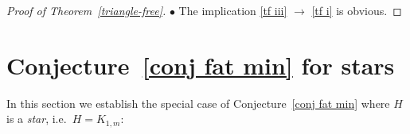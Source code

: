 \documentclass[a4paper]{article}
\newcommand{\Debug}{0}
\newcommand{\comment}[1]{}
\newcommand{\defi}[1]{{\color{darkgray}\emph{#1}}}
\newtheorem{corollary}[proposition]{Corollary}
\newcommand{\N}{\ensuremath{\mathbb N}}
\newcommand{\Tr}[1]{Theorem~\ref{#1}}
\newcommand{\Cnr}[1]{Con\-jecture~\ref{#1}}
\newcommand{\mymargin}[1]{\ifnum \Debug = 1
  \marginpar{\begin{minipage}{\marginparwidth}\small \begin{flushleft}{\color{blue}#1}\end{flushleft}\end{minipage}}\fi
}
\newcommand{\fan}{\mathrm{Fan}}
\begin{document}
\begin{proof}[Proof of \Tr{triangle-free}]
$\bullet$ The implication \ref{tf iii} $\to$ \ref{tf i} is obvious.
\end{proof}

\comment{
The \defi{$k$-fan} $\fan_k$ is the graph obtained from a path $P$ of $k$ vertices by adding a new vertex and joining it to \mymargin{new paragraph} each vertex of $P$ with an edge. By a straightforward modification of the above proof we will obtain the following fact 
\begin{corollary} \label{corol fan}
Let $G$ be a graph with no $K$-fat $\fan_k$-minor, and $M\in \N_*$. Then there is $D=D(K,k,M)$ such that each $MK$-near-component of any `sphere' $S_n, n\in \N$ (defined as above) has diameter at most $D$.
\end{corollary}
\begin{proof}
We argue as in the proof of Claim~1, except that we now pick a sequence $x_1,\ldots, x_k$ of points along the path $P$ with pairwise distance at least $2(M+2)K$, we let $B_o= B(o,n-(M+2)K)$, and let $B_i$ be the component of $x_i$ in\\ $(\pi_{x_i o} \cup P) \cap B(x_i,(M+1)K)$.
\end{proof}
}

\section{\Cnr{conj fat min} for stars} \label{sec stars}

In this section we establish the special case of \Cnr{conj fat min} where $H$ is a \defi{star}, i.e.\ $H=K_{1,m}$:
\end{document}
